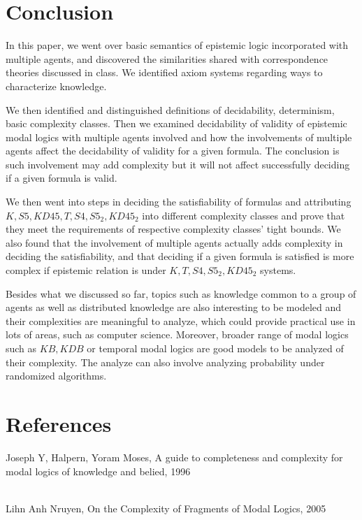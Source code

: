 \documentclass{article}
\begin{document}
\section{Conclusion}
\par In this paper, we went over basic semantics of epistemic logic incorporated with multiple agents, and discovered the similarities shared with correspondence theories discussed in class. We identified axiom systems regarding ways to characterize knowledge.
\par We then identified and distinguished definitions of decidability, determinism, basic complexity classes. Then we examined decidability of validity of epistemic modal logics with multiple agents involved and how the involvements of multiple agents affect the decidability of validity for a given formula. The conclusion is such involvement may add complexity but it will not affect successfully deciding if a given formula is valid.
\par We then went into steps in deciding the satisfiability of formulas and attributing $K, S5, KD45, T,S4, S5_2, KD45_2$ into different complexity classes and prove that they meet the requirements of respective complexity classes' tight bounds. We also found that the involvement of multiple agents actually adds complexity in deciding the satisfiability, and that deciding if a given formula is satisfied is more complex if epistemic relation is under $K, T,S4,S5_2, KD45_2$ systems. 
\par Besides what we discussed so far, topics such as knowledge common to a group of agents as well as distributed knowledge are also interesting to be modeled and their complexities are meaningful to analyze, which could provide practical use in lots of areas, such as computer science. Moreover, broader range of modal logics such as $KB, KDB$ or temporal modal logics are good models to be analyzed of their complexity. The analyze can also involve analyzing probability under randomized algorithms. 
\section{References}
\begin{flushleft}
Joseph Y, Halpern, Yoram Moses, A guide to completeness and complexity for modal logics of knowledge and belied, 1996 \\ \\
\end{flushleft}
Lihn Anh Nruyen, On the Complexity of Fragments of Modal Logics, 2005
\end{document}
